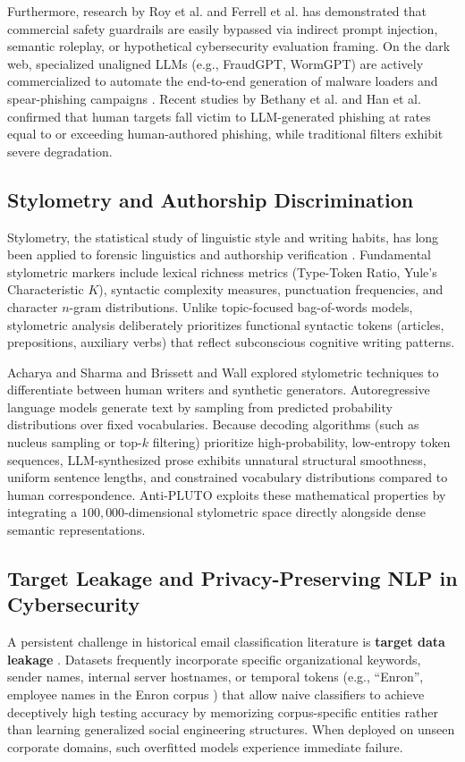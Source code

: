 \documentclass[journal]{IEEEtran}
\begin{document}
Furthermore, research by Roy et al. \cite{roy2024} and Ferrell et al. \cite{ferrell2025} has demonstrated that commercial safety guardrails are easily bypassed via indirect prompt injection, semantic roleplay, or hypothetical cybersecurity evaluation framing. On the dark web, specialized unaligned LLMs (e.g., FraudGPT, WormGPT) are actively commercialized to automate the end-to-end generation of malware loaders and spear-phishing campaigns \cite{gupta2023chatgpt}. Recent studies by Bethany et al. \cite{bethany2025} and Han et al. \cite{han2025} confirmed that human targets fall victim to LLM-generated phishing at rates equal to or exceeding human-authored phishing, while traditional filters exhibit severe degradation.

\subsection{Stylometry and Authorship Discrimination}
Stylometry, the statistical study of linguistic style and writing habits, has long been applied to forensic linguistics and authorship verification \cite{stamatatos2009survey, abbasi2008writeprints}. Fundamental stylometric markers include lexical richness metrics (Type-Token Ratio, Yule's Characteristic $K$), syntactic complexity measures, punctuation frequencies, and character $n$-gram distributions. Unlike topic-focused bag-of-words models, stylometric analysis deliberately prioritizes functional syntactic tokens (articles, prepositions, auxiliary verbs) that reflect subconscious cognitive writing patterns.

Acharya and Sharma \cite{acharya2025} and Brissett and Wall \cite{brissett2025} explored stylometric techniques to differentiate between human writers and synthetic generators. Autoregressive language models generate text by sampling from predicted probability distributions over fixed vocabularies. Because decoding algorithms (such as nucleus sampling or top-$k$ filtering) prioritize high-probability, low-entropy token sequences, LLM-synthesized prose exhibits unnatural structural smoothness, uniform sentence lengths, and constrained vocabulary distributions compared to human correspondence. Anti-PLUTO exploits these mathematical properties by integrating a $100,000$-dimensional stylometric space directly alongside dense semantic representations.

\subsection{Target Leakage and Privacy-Preserving NLP in Cybersecurity}
A persistent challenge in historical email classification literature is \textbf{target data leakage} \cite{pendlebury2019tesseract}. Datasets frequently incorporate specific organizational keywords, sender names, internal server hostnames, or temporal tokens (e.g., ``Enron'', employee names in the Enron corpus \cite{klimt2004enron}) that allow naive classifiers to achieve deceptively high testing accuracy by memorizing corpus-specific entities rather than learning generalized social engineering structures. When deployed on unseen corporate domains, such overfitted models experience immediate failure.
\end{document}
